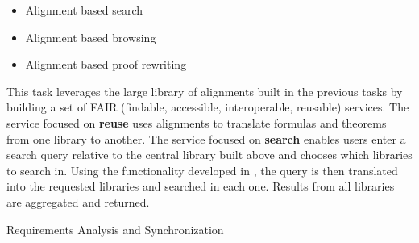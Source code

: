 \begin{workpackage}[id=alignment,wphases=0-48,type=RTD,
  short=Concept Alignment,%
  title=Concept Alignment,
  lead=Pra,
  PraRM=10]
\begin{tasklist}
  \begin{task}[id=alignservices,title=Alignment based services,lead=Fau]
    \begin{itemize}
    \item Alignment based search
    \item Alignment based browsing
    \item Alignment based proof rewriting
    \end{itemize}
    This task leverages the large library of alignments built in the
    previous tasks by building a set of FAIR (findable, accessible,
    interoperable, reusable) services. The service focused on
    \textbf{reuse} uses alignments to translate formulas and theorems
    from one library to another. The service focused on
    \textbf{search} enables users enter a search query relative to the
    central library built above and chooses which libraries to search
    in. Using the functionality developed in
    , the query is then translated into
    the requested libraries and searched in each one.  Results from
    all libraries are aggregated and returned.
  \end{task}
\end{tasklist}

\begin{wpdelivs}
  \begin{wpdeliv}[due=3,miles=startup,id=requirements,dissem=PU,nature=DEM,lead=Inr]
      {Requirements Analysis and Synchronization}
\end{wpdeliv}
\end{wpdelivs}
\end{workpackage}

